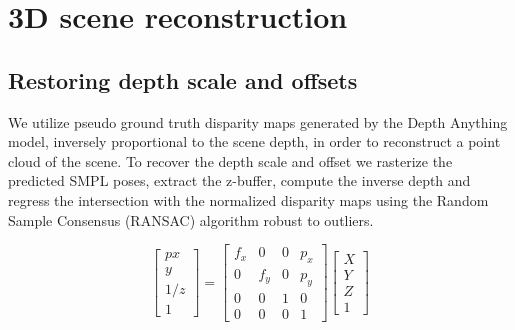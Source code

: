 \section{3D scene reconstruction}








\subsection*{Restoring depth scale and offsets}
We utilize pseudo ground truth disparity maps generated by the Depth Anything model, inversely proportional to the scene depth, in order to reconstruct a point cloud of the scene. To recover the depth scale and offset we rasterize the predicted SMPL poses, extract the z-buffer, compute the inverse depth and regress the intersection with the normalized disparity maps using the Random Sample Consensus (RANSAC) algorithm robust to outliers. 

\begin{equation}
    \begin{bmatrix}p
        x \\ y \\ 1/z \\ 1
    \end{bmatrix} = \begin{bmatrix}
        f_x & 0 & 0 & p_x \\
        0 & f_y & 0 & p_y \\
        0 & 0 & 1 & 0 \\
        0 & 0 & 0 & 1
    \end{bmatrix} \begin{bmatrix}
        X \\ Y \\ Z \\ 1
    \end{bmatrix}
\end{equation}


